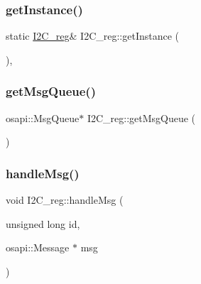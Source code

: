 \mbox{\label{class_i2_c__reg_a1fbc3ac094e2b64324f91019c9fa68e1}} 
\subsubsection{\texorpdfstring{get\+Instance()}{getInstance()}}
{\footnotesize\ttfamily static \hyperlink{class_i2_c__reg}{I2\+C\+\_\+reg}\& I2\+C\+\_\+reg\+::get\+Instance (\begin{DoxyParamCaption}{ }\end{DoxyParamCaption})\hspace{0.3cm}{\ttfamily [inline]}, {\ttfamily [static]}}

\mbox{\label{class_i2_c__reg_aa0db20b76ba93e31051be9f35ae7ee7e}} 
\subsubsection{\texorpdfstring{get\+Msg\+Queue()}{getMsgQueue()}}
{\footnotesize\ttfamily osapi\+::\+Msg\+Queue$\ast$ I2\+C\+\_\+reg\+::get\+Msg\+Queue (\begin{DoxyParamCaption}{ }\end{DoxyParamCaption})\hspace{0.3cm}{\ttfamily [inline]}}

\mbox{\label{class_i2_c__reg_a21a1711d4835a287dde1d08e9e39279d}} 
\subsubsection{\texorpdfstring{handle\+Msg()}{handleMsg()}}
{\footnotesize\ttfamily void I2\+C\+\_\+reg\+::handle\+Msg (\begin{DoxyParamCaption}\item[{unsigned long}]{id,  }\item[{osapi\+::\+Message $\ast$}]{msg }\end{DoxyParamCaption})\hspace{0.3cm}{\ttfamily [private]}}



